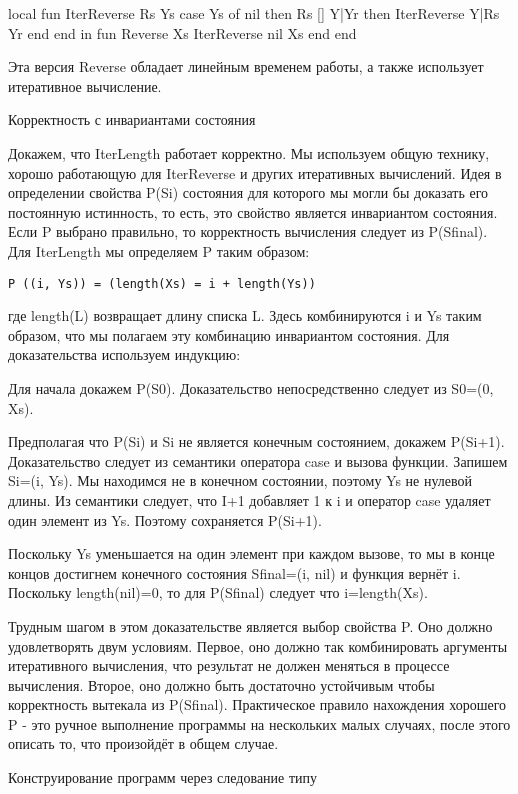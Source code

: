 local
fun {IterReverse Rs Ys}
case Ys
of nil then Rs
[] Y|Yr then {IterReverse Y|Rs Yr}
end
end
in
fun {Reverse Xs}
{IterReverse nil Xs}
end
end

Эта версия Reverse обладает линейным временем работы, а также использует итеративное вычисление.

Корректность с инвариантами состояния

Докажем, что IterLength работает корректно. Мы используем общую технику, хорошо работающую для IterReverse и других итеративных вычислений. Идея в определении свойства P(Si) состояния для которого мы могли бы доказать его постоянную истинность, то есть, это свойство является инвариантом состояния. Если P выбрано правильно, то корректность вычисления следует из P(Sfinal). Для IterLength мы определяем P таким образом:

\begin{lstlisting}
P ((i, Ys)) = (length(Xs) = i + length(Ys))
\end{lstlisting}

где length(L) возвращает длину списка L. Здесь комбинируются i и Ys таким образом, что мы полагаем эту комбинацию инвариантом состояния. Для доказательства используем индукцию:

Для начала докажем P(S0). Доказательство непосредственно следует из S0=(0, Xs).

Предполагая что P(Si) и Si не является конечным состоянием, докажем P(Si+1). Доказательство следует из семантики оператора case и вызова функции. Запишем Si=(i, Ys). Мы находимся не в конечном состоянии, поэтому Ys не нулевой длины. Из семантики следует, что I+1 добавляет 1 к i и оператор case удаляет один элемент из Ys. Поэтому сохраняется P(Si+1).

Поскольку Ys уменьшается на один элемент при каждом вызове, то мы в конце концов достигнем конечного состояния Sfinal=(i, nil) и функция вернёт i. Поскольку length(nil)=0, то для P(Sfinal) следует что i=length(Xs).

Трудным шагом в этом доказательстве является выбор свойства P. Оно должно удовлетворять двум условиям. Первое, оно должно так комбинировать аргументы итеративного вычисления, что результат не должен меняться в процессе вычисления. Второе, оно должно быть достаточно устойчивым чтобы корректность вытекала из P(Sfinal). Практическое правило нахождения хорошего P - это ручное выполнение программы на нескольких малых случаях, после этого описать то, что произойдёт в общем случае.

Конструирование программ через следование типу

